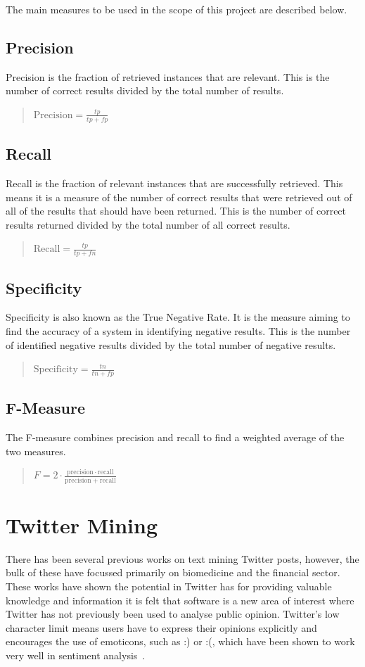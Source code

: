 The main measures to be used in the scope of this project are described below.

\subsection{Precision}
Precision is the fraction of retrieved instances that are relevant. This is the number of correct results divided by the total number of results.
\begin{quote}
$\mathrm{Precision}=\frac{tp}{tp+fp}$
\end{quote}

\subsection{Recall}
Recall is the fraction of relevant instances that are successfully retrieved. This means it is a measure of the number of correct results that were retrieved out of all of the results that should have been returned. This is the number of correct results returned divided by the total number of all correct results.
\begin{quote}
$\mathrm{Recall}=\frac{tp}{tp+fn}$
\end{quote}

\subsection{Specificity}
Specificity is also known as the True Negative Rate. It is the measure aiming to find the accuracy of a system in identifying negative results. This is the number of identified negative results divided by the total number of negative results.
\begin{quote}
$\mathrm{Specificity}=\frac{tn}{tn+fp}$
\end{quote}

\subsection{F-Measure}
The F-measure combines precision and recall to find a weighted average of the two measures.
\begin{quote}
$F = 2 \cdot \frac{\mathrm{precision} \cdot \mathrm{recall}}{\mathrm{precision} + \mathrm{recall}}$
\end{quote}

\section{Twitter Mining}
There has been several previous works on text mining Twitter posts, however, the bulk of these have focussed primarily on biomedicine and the financial sector. These works have shown the potential in Twitter has for providing valuable knowledge and information it is felt that software is a new area of interest where Twitter has not previously been used to analyse public opinion. Twitter's low character limit means users have to express their opinions explicitly and encourages the use of emoticons, such as :) or :(, which have been shown to work very well in sentiment analysis~\cite{Read:2005}.

